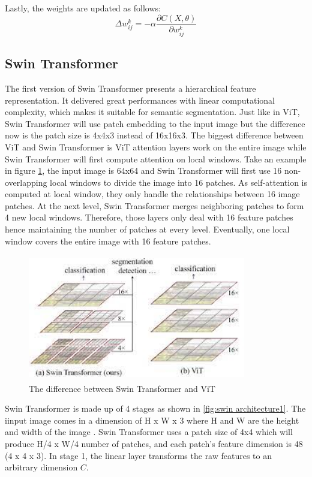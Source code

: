 Lastly, the weights are updated as follows:
\begin{equation}
    \Delta w_{ij}^k = - \alpha \frac{\partial C(X,\theta)}{\partial w_{ij}^k}
\end{equation}

\subsection{Swin Transformer}
The first version of Swin Transformer \cite{swin-v1} presents a hierarchical feature representation. It delivered great performances with linear computational complexity, which makes it suitable for semantic segmentation. Just like in ViT, Swin Transformer will use patch embedding to the input image but the difference now is the patch size is 4x4x3 instead of 16x16x3. The biggest difference between ViT and Swin Transformer is ViT attention layers work on the entire image while Swin Transformer will first compute attention on local windows. Take an example in figure \ref{fig:swin-vs-vit}, the input image is 64x64 and Swin Transformer will first use 16 non-overlapping local windows to divide the image into 16 patches. As self-attention is computed at local window, they only handle the relationships between 16 image patches. At the next level, Swin Transformer merges neighboring patches to form 4 new local windows. Therefore, those layers only deal with 16 feature patches hence maintaining the number of patches at every level. Eventually, one local window covers the entire image with 16 feature patches.
\FloatBarrier
\begin{figure}[ht]
\centering
\includegraphics[width=9.5cm, height=5.5cm]{images/swin vs vit.png}
\caption{The difference between Swin Transformer and ViT \protect\cite{swin-v1}}
\label{fig:swin-vs-vit}
\end{figure}
\FloatBarrier

Swin Transformer is made up of 4 stages as shown in \ref{fig:swin architecture1}. The iinput image comes in a dimension of H x W x 3 where H and W are the height and width of the image . Swin Transformer uses a patch size of 4x4 which will produce H/4 x W/4 number of patches, and each patch’s feature dimension is 48 (4 x 4 x 3). In stage 1, the linear layer transforms the raw features to an arbitrary dimension $C$.

